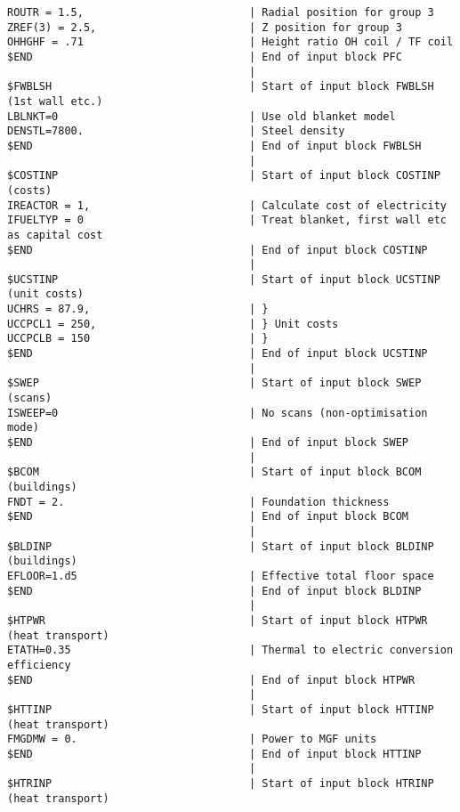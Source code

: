 \documentclass[11pt,a4paper]{report}
\begin{document}
\begin{verbatim}
ROUTR = 1.5,                          | Radial position for group 3
ZREF(3) = 2.5,                        | Z position for group 3
OHHGHF = .71                          | Height ratio OH coil / TF coil
$END                                  | End of input block PFC
                                      | 
$FWBLSH                               | Start of input block FWBLSH (1st wall etc.)
LBLNKT=0                              | Use old blanket model
DENSTL=7800.                          | Steel density
$END                                  | End of input block FWBLSH
                                      | 
$COSTINP                              | Start of input block COSTINP (costs)
IREACTOR = 1,                         | Calculate cost of electricity
IFUELTYP = 0                          | Treat blanket, first wall etc as capital cost
$END                                  | End of input block COSTINP
                                      | 
$UCSTINP                              | Start of input block UCSTINP (unit costs)
UCHRS = 87.9,                         | }
UCCPCL1 = 250,                        | } Unit costs
UCCPCLB = 150                         | }
$END                                  | End of input block UCSTINP
                                      | 
$SWEP                                 | Start of input block SWEP (scans)
ISWEEP=0                              | No scans (non-optimisation mode)
$END                                  | End of input block SWEP
                                      | 
$BCOM                                 | Start of input block BCOM (buildings)
FNDT = 2.                             | Foundation thickness
$END                                  | End of input block BCOM
                                      | 
$BLDINP                               | Start of input block BLDINP (buildings)
EFLOOR=1.d5                           | Effective total floor space
$END                                  | End of input block BLDINP
                                      | 
$HTPWR                                | Start of input block HTPWR (heat transport)
ETATH=0.35                            | Thermal to electric conversion efficiency
$END                                  | End of input block HTPWR
                                      | 
$HTTINP                               | Start of input block HTTINP (heat transport)
FMGDMW = 0.                           | Power to MGF units
$END                                  | End of input block HTTINP
                                      | 
$HTRINP                               | Start of input block HTRINP (heat transport)

\end{verbatim}
\end{document}
